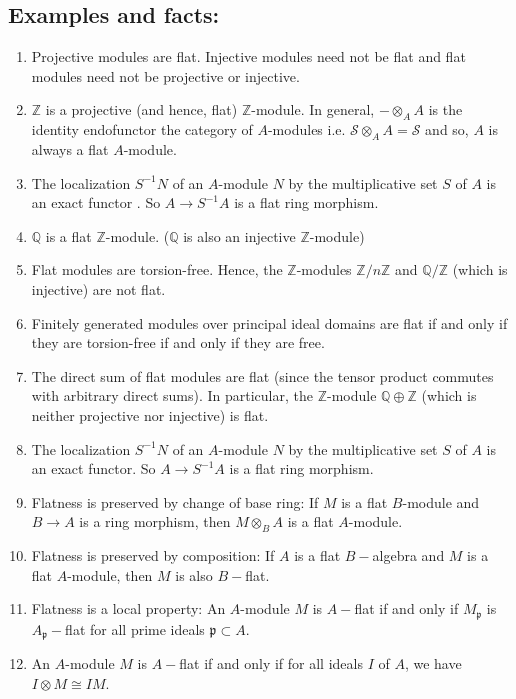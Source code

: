 \documentclass[12pt]{article}
\theoremstyle{mytheoremstyle}
\newcommand{\bZ}{\mathbb{Z}}
\newcommand{\bQ}{\mathbb{Q}}
\newcommand{\cS}{\mathcal{S}}
\begin{document}
\subsection*{Examples and facts:}
\begin{enumerate}
    \item Projective modules are flat. Injective modules need not be flat
        and flat modules need not be projective or injective.
    \item $\mathbb{Z}$ is a projective (and hence, flat) $\bZ$-module.
        In general, $-\otimes_A A$ is the identity endofunctor
        the category of $A$-modules
        i.e. $\cS\otimes_A A = \cS$ and so,
        $A$ is always a flat $A$-module.
    \item The localization $S^{-1}N$ of an $A$-module $N$ by the multiplicative
        set $S$ of $A$ is an exact functor . So $A\to S^{-1}A$ is a flat ring
        morphism.
    \item $\bQ$ is a flat $\bZ$-module. ($\bQ$ is also an injective
        $\bZ$-module)
    \item Flat modules are torsion-free. Hence, the $\bZ$-modules
        $\bZ/n\bZ$ and $\bQ/\bZ$ (which is injective) are not flat.
    \item Finitely generated modules over principal ideal domains are
        flat if and only if they are torsion-free if and only if they
        are free.
    \item The direct sum of flat modules are flat (since the tensor
        product commutes with arbitrary direct sums). In particular,
        the $\bZ$-module $\bQ\oplus\bZ$ (which is neither projective
        nor injective) is flat.
    \item The localization $S^{-1}N$ of an $A$-module $N$ by the multiplicative
        set $S$ of $A$ is an exact functor. So $A\to S^{-1}A$ is a flat ring
        morphism.
    \item Flatness is preserved by change of base ring:
        If $M$ is a flat $B$-module and $B\to A$ is a ring morphism,
        then $M\otimes_B A$ is a flat $A$-module.
    \item Flatness is preserved by composition:
        If $A$ is a flat $B-$algebra and $M$ is a flat $A$-module, then
        $M$ is also $B-$flat.
    \item Flatness is a local property:
        An $A$-module $M$ is $A-$flat if and only if $M_\mathfrak{p}$
        is $A_\mathfrak{p}-$flat for all prime ideals $\mathfrak{p}
        \subset A$.
    \item An $A$-module $M$ is $A-$flat if and only if for all ideals $I$
        of $A$, we have $I\otimes M\cong IM$.
\end{enumerate}
\end{document}

